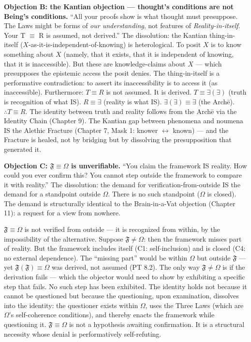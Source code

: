 \documentclass[10pt, openany, oneside]{book}
\begin{document}
\textbf{Objection B: the Kantian objection --- thought's conditions are not Being's conditions.} ``All your proofs show is what thought must presuppose. The Laws might be forms of \textit{our understanding}, not features of \textit{Reality-in-itself}. Your T $\equiv$ R is assumed, not derived.'' The dissolution: the Kantian thing-in-itself ($X$-as-it-is-independent-of-knowing) is heterological. To posit $X$ is to know something about $X$ (namely, that it exists, that it is independent of knowing, that it is inaccessible). But these are knowledge-claims about $X$ --- which presupposes the epistemic access the posit denies. The thing-in-itself is a performative contradiction: to assert its inaccessibility is to access it (as inaccessible). Furthermore: $T \equiv R$ is not assumed. It is derived. $T \equiv \exists(\exists)$ (truth is recognition of what IS). $R \equiv \exists$ (reality is what IS). $\exists(\exists) \equiv \exists$ (the Arch\={e}). $\therefore T \equiv R$. The identity between truth and reality follows from the Arch\={e} via the Identity Chain (Chapter 9). The Kantian gap between phenomena and noumena IS the Alethic Fracture (Chapter 7, Mask 1: knower $\leftrightarrow$ known) --- and the Fracture is healed, not by bridging but by dissolving the presupposition that generated it.

\textbf{Objection C: $\mathfrak{F} \equiv \Omega$ is unverifiable.} ``You claim the framework IS reality. How could you ever confirm this? You cannot step outside the framework to compare it with reality.'' The dissolution: the demand for verification-from-outside IS the demand for a standpoint outside $\Omega$. There is no such standpoint ($\Omega$ is closed). The demand is structurally identical to the Brain-in-a-Vat objection (Chapter 11): a request for a view from nowhere.

$\mathfrak{F} \equiv \Omega$ is not verified from outside --- it is recognized from within, by the impossibility of the alternative. Suppose $\mathfrak{F} \neq \Omega$: then the framework misses part of reality. But the framework includes itself (C1: self-inclusion) and is closed (C4: no external dependence). The ``missing part'' would be within $\Omega$ but outside $\mathfrak{F}$ --- yet $\mathfrak{F}(\mathfrak{F}) \equiv \Omega$ was derived, not assumed (PT 8.2). The only way $\mathfrak{F} \neq \Omega$ is if the derivation fails --- which the objector would need to show by exhibiting a specific step that fails. No such step has been exhibited. The identity holds not because it cannot be questioned but because the questioning, upon examination, dissolves into the identity: the questioner exists within $\Omega$, uses the Three Laws (which are $\Omega$'s self-coherence conditions), and thereby enacts the framework while questioning it. $\mathfrak{F} \equiv \Omega$ is not a hypothesis awaiting confirmation. It is a structural necessity whose denial is performatively self-refuting.
\end{document}
